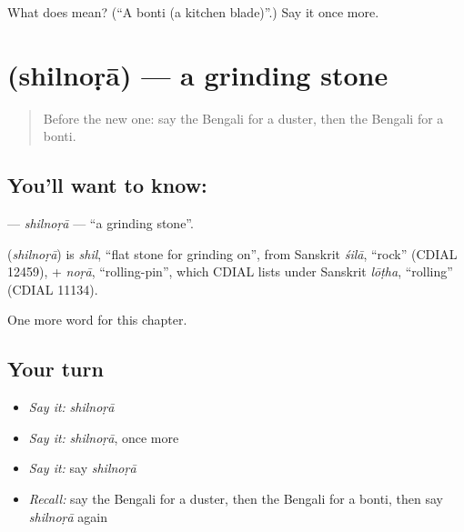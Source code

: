\begin{tcolorbox}[breakable,colback=teal!4,colframe=teal!35!black,title={Before you move on}]
What does  mean? (\textquotedblleft{}A bonti (a kitchen blade)\textquotedblright{}.) Say it once more.
\end{tcolorbox}
\section[\texorpdfstring{\bn{শিলনোড়া} (shilnoṛā)}{শিলনোড়া (shilnoṛā)}]{ (shilnoṛā) — a grinding stone}

\label{lesson:BN-C175-shilnora}



\begin{quote}
Before the new one: say the Bengali for a duster, then the Bengali for a bonti.
\end{quote}

\subsection*{You'll want to know: }
\textbf{} — \emph{shilnoṛā} — \textquotedblleft{}a grinding stone\textquotedblright{}.

\begin{cousinweb}
\textbf{} (\emph{shilnoṛā}) is \emph{shil}, \textquotedblleft{}flat stone for grinding on\textquotedblright{}, from Sanskrit \emph{śilā}, \textquotedblleft{}rock\textquotedblright{} (CDIAL 12459), + \emph{noṛā}, \textquotedblleft{}rolling-pin\textquotedblright{}, which CDIAL lists under Sanskrit \emph{lōṭha}, \textquotedblleft{}rolling\textquotedblright{} (CDIAL 11134).
\end{cousinweb}

\begin{grammarlens}[title={What you've built}]
One more word for this chapter.
\end{grammarlens}

\subsection*{Your turn}
\begin{itemize}
\raggedright
  \item \emph{Say it:} \emph{shilnoṛā}
  \item \emph{Say it:} \emph{shilnoṛā}, once more
  \item \emph{Say it:} say \emph{shilnoṛā}
  \item \emph{Recall:} say the Bengali for a duster, then the Bengali for a bonti, then say \emph{shilnoṛā} again
\end{itemize}

